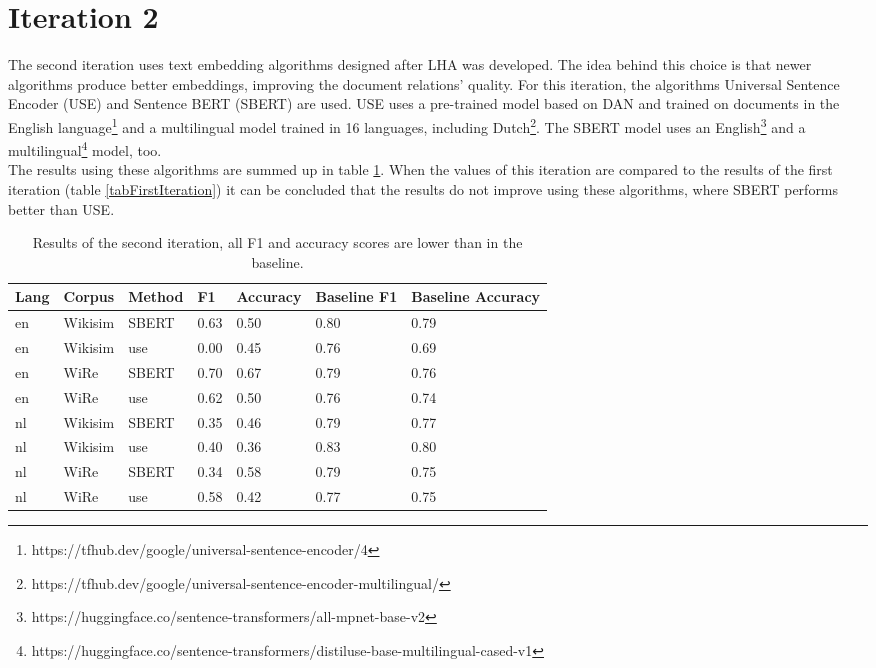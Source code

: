 { 
 \section{Iteration 2}
 \label{secIteration2}
 The second iteration uses text embedding algorithms designed after LHA was developed. The idea behind this choice is that newer algorithms produce better embeddings, improving the document relations' quality. For this iteration, the algorithms Universal Sentence Encoder (USE) \citep{cer2018universal} and Sentence BERT \citep{reimers2019sentence} (SBERT) are used. USE uses a pre-trained model based on DAN and trained on documents in the English language\footnote{https://tfhub.dev/google/universal-sentence-encoder/4} and a multilingual model trained in 16 languages, including Dutch\footnote{https://tfhub.dev/google/universal-sentence-encoder-multilingual/}. The SBERT model uses an English\footnote{https://huggingface.co/sentence-transformers/all-mpnet-base-v2} and a multilingual\footnote{https://huggingface.co/sentence-transformers/distiluse-base-multilingual-cased-v1} model, too.\\
 
 The results using these algorithms are summed up in table \ref{tabSecondtIteration}. When the values of this iteration are compared to the results of the first iteration (table \ref{tabFirstIteration}) it can be concluded that the results do not improve using these algorithms, where SBERT performs better than USE.
 
  \begin{table}[!ht]
      \centering
    \captionsetup{justification=centering}
    \begin{tabular}{l|l|l|l|l|l|l}
    \hline
        \textbf{Lang} & \textbf{Corpus} & \textbf{Method} &  \textbf{F1} & \textbf{Accuracy} & \textbf{Baseline F1} & \textbf{Baseline Accuracy} \\ \hline
en & Wikisim & SBERT & 0.63 & 0.50 & 0.80 & 0.79 \\ \hline
en & Wikisim & use &  0.00 & 0.45 & 0.76 & 0.69 \\ \hline
en & WiRe & SBERT & 0.70 & 0.67 & 0.79 & 0.76 \\ \hline
en & WiRe & use &  0.62 & 0.50 & 0.76 & 0.74 \\ \hline
nl & Wikisim & SBERT & 0.35 & 0.46 & 0.79 & 0.77 \\ \hline
nl & Wikisim & use & 0.40 & 0.36 & 0.83 & 0.80 \\ \hline
nl & WiRe & SBERT & 0.34 & 0.58 & 0.79 & 0.75 \\ \hline
nl & WiRe & use & 0.58 & 0.42 & 0.77 & 0.75 \\ \hline
\end{tabular}
    \caption{Results of the second iteration, all F1 and accuracy scores are lower than in the baseline.}
    \label{tabSecondtIteration}
\end{table}


}
